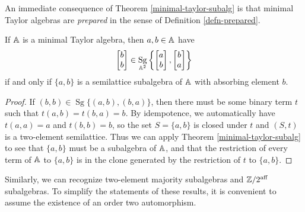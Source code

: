 \documentclass[letterpaper,11pt]{article}
\DeclareMathOperator{\Sg}{Sg}
\DeclareMathOperator{\aff}{aff}
\begin{document}
An immediate consequence of Theorem \ref{minimal-taylor-subalg} is that minimal Taylor algebras are \emph{prepared} in the sense of Definition \ref{defn-prepared}.

\begin{prop} If $\mathbb{A}$ is a minimal Taylor algebra, then $a, b \in \mathbb{A}$ have
\[
\begin{bmatrix} b\\ b\end{bmatrix} \in \Sg_{\bA^2}\left\{\begin{bmatrix} a\\ b\end{bmatrix}, \begin{bmatrix} b\\ a\end{bmatrix}\right\}
\]
if and only if $\{a,b\}$ is a semilattice subalgebra of $\mathbb{A}$ with absorbing element $b$.
\end{prop}
\begin{proof} If $(b,b) \in \Sg\{(a,b),(b,a)\}$, then there must be some binary term $t$ such that $t(a,b) = t(b,a) = b$. By idempotence, we automatically have $t(a,a) = a$ and $t(b,b) = b$, so the set $S = \{a,b\}$ is closed under $t$ and $(S,t)$ is a two-element semilattice. Thus we can apply Theorem \ref{minimal-taylor-subalg} to see that $\{a,b\}$ must be a subalgebra of $\mathbb{A}$, and that the restriction of every term of $\mathbb{A}$ to $\{a,b\}$ is in the clone generated by the restriction of $t$ to $\{a,b\}$.
\end{proof}

Similarly, we can recognize two-element majority subalgebras and $\ZZ/2^{\aff}$ subalgebras. To simplify the statements of these results, it is convenient to assume the existence of an order two automorphism.
\end{document}
